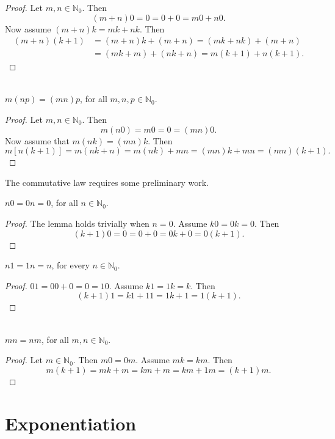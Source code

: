 \begin{proof}
Let $m,n\in \mathbb{N}_0$.  Then
\[
(m+n)0 =0 = 0+0 = m0 + n0.
\]
Now assume $(m+n)k = mk + nk$.
Then
\begin{align*}
(m+n)(k+1)&=(m+n)k+(m+n)= (mk+nk) +(m+n)\\
&=(mk+m)+(nk+n)=m(k+1)+n(k+1).
\end{align*}
\end{proof}

\begin{theorem}{}\\
$m(np) = (mn)p$, for all $m,n,p\in \mathbb{N}_0$.
\end{theorem}

\begin{proof}
Let $m,n\in \mathbb{N}_0$.  Then
\[
m(n0)= m0 = 0 = (mn)0.
\]
Now assume that $m(nk)=(mn)k$.  Then
\[
m[n(k+1)]= m(nk + n)= m(nk) + mn =(mn)k + mn = (mn)(k+1).
\]
\end{proof}

The commutative law requires  some preliminary work.

\begin{lemma}
$n0= 0n=0$, for all $n\in \mathbb{N}_0$.
\end{lemma}

\begin{proof}
The lemma holds trivially when $n=0$.  Assume $k0=
0k=0$.  Then
\[
(k+1)0 =0 = 0+0= 0k+0=0(k+1).
\]
\end{proof}

\begin{lemma}
$n1 =1n=n$, for every $n\in \mathbb{N}_0$.
\end{lemma}
\begin{proof}
$01=00+0=0 =10$.  Assume
$k1=1k=k$.  Then
\[
(k+1)1=k1+11=1k+1=1(k+1).
\]
\end{proof}

\begin{theorem}{}\\
$mn=nm$, for all $m,n\in \mathbb{N}_0$.
\end{theorem}

\begin{proof} Let $m\in \mathbb{N}_0$.
Then $m0=0m$.
Assume $mk=km$. Then
\[
m (k+1) = mk +m = km+m= km +1m=(k+1)m.
\]
\end{proof}

\section{Exponentiation}\label{s:background:exp}

